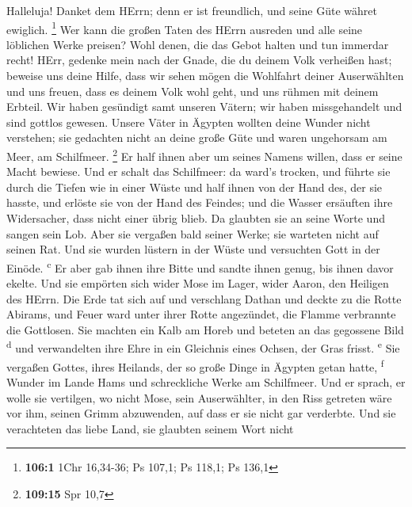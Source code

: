  Halleluja! Danket dem HErrn; denn er ist freundlich, und
seine Güte währet ewiglich. \footnote{\textbf{106:1} 1Chr 16,34-36; Ps
  107,1; Ps 118,1; Ps 136,1}  Wer kann die großen Taten
des HErrn ausreden und alle seine löblichen Werke preisen?
 Wohl denen, die das Gebot halten und tun immerdar recht!
 HErr, gedenke mein nach der Gnade, die du deinem Volk
verheißen hast; beweise uns deine Hilfe,  dass wir sehen
mögen die Wohlfahrt deiner Auserwählten und uns freuen, dass es deinem
Volk wohl geht, und uns rühmen mit deinem Erbteil.  Wir
haben gesündigt samt unseren Vätern; wir haben missgehandelt und sind
gottlos gewesen.  Unsere Väter in Ägypten wollten deine
Wunder nicht verstehen; sie gedachten nicht an deine große Güte und
waren ungehorsam am Meer, am Schilfmeer. \footnote{\textbf{109:15} Spr
  10,7}  Er half ihnen aber um seines Namens willen, dass
er seine Macht bewiese.  Und er schalt das Schilfmeer: da
ward's trocken, und führte sie durch die Tiefen wie in einer Wüste
 und half ihnen von der Hand des, der sie hasste, und
erlöste sie von der Hand des Feindes;  und die Wasser
ersäuften ihre Widersacher, dass nicht einer übrig blieb.
 Da glaubten sie an seine Worte und sangen sein Lob.
 Aber sie vergaßen bald seiner Werke; sie warteten nicht
auf seinen Rat.  Und sie wurden lüstern in der Wüste und
versuchten Gott in der Einöde. \textsuperscript{c}  Er
aber gab ihnen ihre Bitte und sandte ihnen genug, bis ihnen davor
ekelte.  Und sie empörten sich wider Mose im Lager, wider
Aaron, den Heiligen des HErrn.  Die Erde tat sich auf und
verschlang Dathan und deckte zu die Rotte Abirams,  und
Feuer ward unter ihrer Rotte angezündet, die Flamme verbrannte die
Gottlosen.  Sie machten ein Kalb am Horeb und beteten an
das gegossene Bild \textsuperscript{d}  und verwandelten
ihre Ehre in ein Gleichnis eines Ochsen, der Gras frisst.
\textsuperscript{e}  Sie vergaßen Gottes, ihres Heilands,
der so große Dinge in Ägypten getan hatte, \textsuperscript{f}
 Wunder im Lande Hams und schreckliche Werke am
Schilfmeer.  Und er sprach, er wolle sie vertilgen, wo
nicht Mose, sein Auserwählter, in den Riss getreten wäre vor ihm, seinen
Grimm abzuwenden, auf dass er sie nicht gar verderbte. 
Und sie verachteten das liebe Land, sie glaubten seinem Wort nicht
